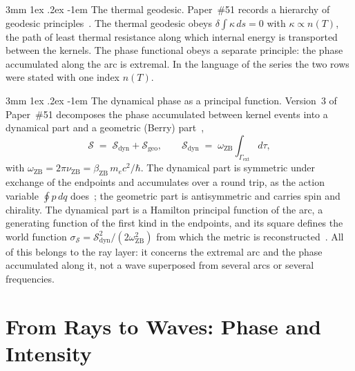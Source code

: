 \documentclass[%
 reprint, amsmath,amssymb, aps, prb, ]{revtex4-2}
\makeatletter
\numberwithin{equation}{section}
\renewcommand\paragraph{%
  \@startsection{paragraph}{4}{\z@}%
    {3mm \@plus 1ex \@minus .2ex}%
    {-1em}%
    {\normalfont\normalsize\itshape}}
\newcommand{\omZB}{\omega_{\text{ZB}}}
\newcommand{\bZB}{\beta_{\mathrm{ZB}}}
\newcommand{\Sdyn}{\mathcal{S}_{\mathrm{dyn}}}
\makeatother
\begin{document}
\paragraph{The thermal geodesic.} Paper~\#51 records a hierarchy of geodesic principles~\cite{H51}. The thermal geodesic obeys $\delta\int\kappa\,ds = 0$ with $\kappa \propto n(T)$, the path of least thermal resistance along which internal energy is transported between the kernels. The phase functional obeys a separate principle: the phase accumulated along the arc is extremal. In the language of the series the two rows were stated with one index $n(T)$.

\paragraph{The dynamical phase as a principal function.} Version~3 of Paper~\#51 decomposes the phase accumulated between kernel events into a dynamical part and a geometric (Berry) part~\cite{H51, Berry1984},
\begin{equation}
\mathcal{S} \;=\; \Sdyn + \mathcal{S}_{\mathrm{geo}},
\qquad
\Sdyn \;=\; \omZB\int_{\Gamma_{\mathrm{ext}}} d\tau,
\label{eq:Sdecomp}
\end{equation}
with $\omZB = 2\pi\nu_{\mathrm{ZB}} = \bZB\,m_ec^2/\hbar$. The dynamical part is symmetric under exchange of the endpoints and accumulates over a round trip, as the action variable $\oint p\,dq$ does~\cite{Yukawa1954}; the geometric part is antisymmetric and carries spin and chirality. The dynamical part is a Hamilton principal function of the arc, a generating function of the first kind in the endpoints, and its square defines the world function $\sigma_{\mathcal{S}} = \Sdyn^2/(2\omZB^2)$ from which the metric is reconstructed~\cite{H51, Synge1960}. All of this belongs to the ray layer: it concerns the extremal arc and the phase accumulated along it, not a wave superposed from several arcs or several frequencies.

\section{From Rays to Waves: Phase and Intensity}
\label{sec:waves}
\end{document}
